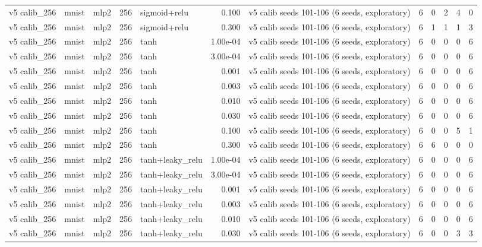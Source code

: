 \begin{table}[htbp]
{\begin{tabular}{@{}lllrlrlrrrrr@{}}
v5 calib\_256 & mnist & mlp2 & 256 & sigmoid+relu & 0.100 & v5 calib seeds 101-106 (6 seeds, exploratory) & 6 & 0 & 2 & 4 & 0 \\
v5 calib\_256 & mnist & mlp2 & 256 & sigmoid+relu & 0.300 & v5 calib seeds 101-106 (6 seeds, exploratory) & 6 & 1 & 1 & 1 & 3 \\
v5 calib\_256 & mnist & mlp2 & 256 & tanh & 1.00e-04 & v5 calib seeds 101-106 (6 seeds, exploratory) & 6 & 0 & 0 & 0 & 6 \\
v5 calib\_256 & mnist & mlp2 & 256 & tanh & 3.00e-04 & v5 calib seeds 101-106 (6 seeds, exploratory) & 6 & 0 & 0 & 0 & 6 \\
v5 calib\_256 & mnist & mlp2 & 256 & tanh & 0.001 & v5 calib seeds 101-106 (6 seeds, exploratory) & 6 & 0 & 0 & 0 & 6 \\
v5 calib\_256 & mnist & mlp2 & 256 & tanh & 0.003 & v5 calib seeds 101-106 (6 seeds, exploratory) & 6 & 0 & 0 & 0 & 6 \\
v5 calib\_256 & mnist & mlp2 & 256 & tanh & 0.010 & v5 calib seeds 101-106 (6 seeds, exploratory) & 6 & 0 & 0 & 0 & 6 \\
v5 calib\_256 & mnist & mlp2 & 256 & tanh & 0.030 & v5 calib seeds 101-106 (6 seeds, exploratory) & 6 & 0 & 0 & 0 & 6 \\
v5 calib\_256 & mnist & mlp2 & 256 & tanh & 0.100 & v5 calib seeds 101-106 (6 seeds, exploratory) & 6 & 0 & 0 & 5 & 1 \\
v5 calib\_256 & mnist & mlp2 & 256 & tanh & 0.300 & v5 calib seeds 101-106 (6 seeds, exploratory) & 6 & 6 & 0 & 0 & 0 \\
v5 calib\_256 & mnist & mlp2 & 256 & tanh+leaky\_relu & 1.00e-04 & v5 calib seeds 101-106 (6 seeds, exploratory) & 6 & 0 & 0 & 0 & 6 \\
v5 calib\_256 & mnist & mlp2 & 256 & tanh+leaky\_relu & 3.00e-04 & v5 calib seeds 101-106 (6 seeds, exploratory) & 6 & 0 & 0 & 0 & 6 \\
v5 calib\_256 & mnist & mlp2 & 256 & tanh+leaky\_relu & 0.001 & v5 calib seeds 101-106 (6 seeds, exploratory) & 6 & 0 & 0 & 0 & 6 \\
v5 calib\_256 & mnist & mlp2 & 256 & tanh+leaky\_relu & 0.003 & v5 calib seeds 101-106 (6 seeds, exploratory) & 6 & 0 & 0 & 0 & 6 \\
v5 calib\_256 & mnist & mlp2 & 256 & tanh+leaky\_relu & 0.010 & v5 calib seeds 101-106 (6 seeds, exploratory) & 6 & 0 & 0 & 0 & 6 \\
v5 calib\_256 & mnist & mlp2 & 256 & tanh+leaky\_relu & 0.030 & v5 calib seeds 101-106 (6 seeds, exploratory) & 6 & 0 & 0 & 3 & 3 \\

\end{tabular}}
\end{table}
